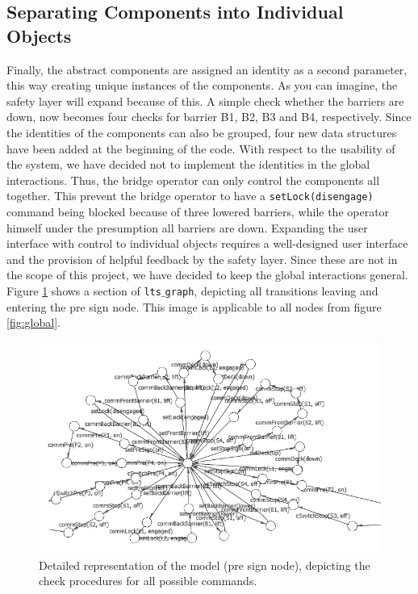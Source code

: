 \subsection{Separating Components into Individual Objects}
\label{sec:ids}
Finally, the abstract components are assigned an  identity as a second parameter, this way creating unique instances of the components. As you can imagine, the safety layer will expand because of this. A simple check whether the barriers are down, now becomes four checks for barrier B1, B2, B3 and B4, respectively. Since the identities of the components can also be grouped, four new data structures have been added at the beginning of the code. With respect to the usability of the system, we have decided not to implement the identities in the global interactions. Thus, the bridge operator can only control the components all together. This prevent the bridge operator to have a \texttt{setLock(disengage)} command being blocked because of three lowered barriers, while the operator himself under the presumption all barriers are down. Expanding the user interface with control to individual objects requires a well-designed user interface and the provision of helpful feedback by the safety layer. Since these are not in the scope of this project, we have decided to keep the global interactions general. Figure \ref{fig:detailed} shows a section of \texttt{lts$\_$graph}, depicting all transitions leaving and entering the pre sign node. This image is applicable to all nodes from figure \ref{fig:global}.
%
\begin{figure}[htb]
\centering
\includegraphics[width=\columnwidth]{Images/detail_graph_gebeund.png}
\caption{Detailed representation of the model (pre sign node), depicting the check procedures for all possible commands.}%
\label{fig:detailed}
\end{figure}%
%

\newpage